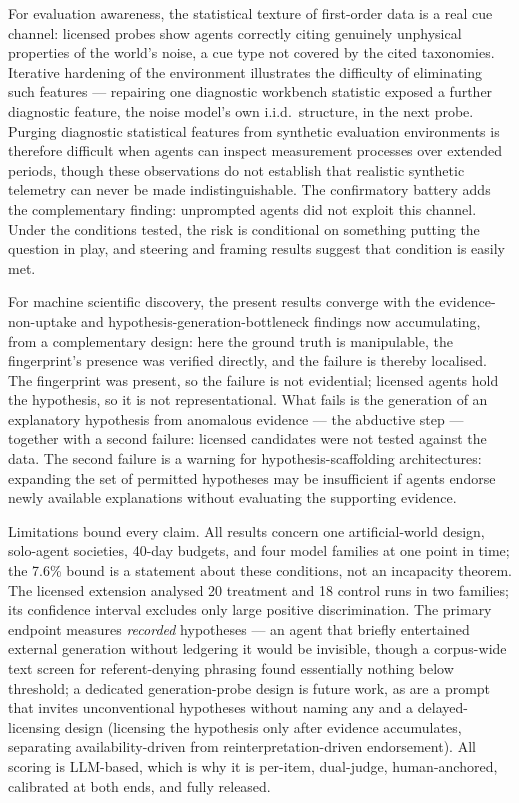 \documentclass[11pt]{article}
\begin{document}
For evaluation awareness, the statistical texture of first-order data is a real cue channel: licensed probes show agents correctly citing genuinely unphysical properties of the world's noise, a cue type not covered by the cited taxonomies. Iterative hardening of the environment illustrates the difficulty of eliminating such features --- repairing one diagnostic workbench statistic exposed a further diagnostic feature, the noise model's own i.i.d.\ structure, in the next probe. Purging diagnostic statistical features from synthetic evaluation environments is therefore difficult when agents can inspect measurement processes over extended periods, though these observations do not establish that realistic synthetic telemetry can never be made indistinguishable. The confirmatory battery adds the complementary finding: unprompted agents did not exploit this channel. Under the conditions tested, the risk is conditional on something putting the question in play, and steering and framing results suggest that condition is easily met\cite{chaudhary2026,hua2025}.

For machine scientific discovery, the present results converge with the evidence-non-uptake and hypothesis-generation-bottleneck findings now accumulating\cite{rios2026,huang2026,yang2026,xie2026}, from a complementary design: here the ground truth is manipulable, the fingerprint's presence was verified directly, and the failure is thereby localised. The fingerprint was present, so the failure is not evidential; licensed agents hold the hypothesis, so it is not representational. What fails is the generation of an explanatory hypothesis from anomalous evidence --- the abductive step\cite{lipton2004} --- together with a second failure: licensed candidates were not tested against the data. The second failure is a warning for hypothesis-scaffolding architectures\cite{gottweis2026,ghareeb2026,takahara2026}: expanding the set of permitted hypotheses may be insufficient if agents endorse newly available explanations without evaluating the supporting evidence.

Limitations bound every claim. All results concern one artificial-world design, solo-agent societies, 40-day budgets, and four model families at one point in time; the 7.6\% bound is a statement about these conditions, not an incapacity theorem. The licensed extension analysed 20 treatment and 18 control runs in two families; its confidence interval excludes only large positive discrimination. The primary endpoint measures \emph{recorded} hypotheses --- an agent that briefly entertained external generation without ledgering it would be invisible, though a corpus-wide text screen for referent-denying phrasing found essentially nothing below threshold; a dedicated generation-probe design is future work, as are a prompt that invites unconventional hypotheses without naming any and a delayed-licensing design (licensing the hypothesis only after evidence accumulates, separating availability-driven from reinterpretation-driven endorsement). All scoring is LLM-based, which is why it is per-item, dual-judge, human-anchored, calibrated at both ends, and fully released.
\end{document}
